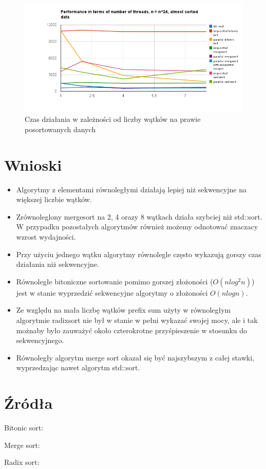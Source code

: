 \documentclass[11pt]{article}
\begin{document}
\begin{figure}[H]
\includegraphics[width=1.20\textwidth, height=0.35\textheight, left]{almost_sorted_data.png}
\caption{Czas działania w zależności od liczby wątków na prawie posortowanych danych}
\end{figure}

\section{Wnioski}
\begin{itemize}
\item
Algorytmy z elementami równoległymi działają lepiej niż sekwencyjne na większej liczbie wątków.
\item
Zrównoleglony mergesort na 2, 4 orazy 8 wątkach działa szybciej niż std::sort. W przypadku pozostałych algorytmów również możemy odnotować znaczacy wzrost wydajności.
\item
Przy użyciu jednego wątku algorytmy równolegle często wykazują gorszy czas działania niż sekwencyjne.
\item
Równoległe bitoniczne sortowanie pomimo gorszej złożoności ($O(nlog^2n)$) jest w stanie wyprzedzić sekwencyjne algorytmy o złożoności $O(nlogn)$.
\item
Ze względu na mała liczbę wątków prefix sum użyty w równoległym algorytmie radixsort nie był w stanie w pełni wykazać swojej mocy, ale i tak możnaby było zauważyć około czterokrotne przyśpieszenie w stosunku do sekwencyjnego.
\item
Równoległy algorytm merge sort okazał się być najszybszym z całej stawki, wyprzedzając nawet algorytm std::sort.
\end{itemize}

\section{Źródła}
Bitonic sort:


Merge sort:


Radix sort:

\end{document}
